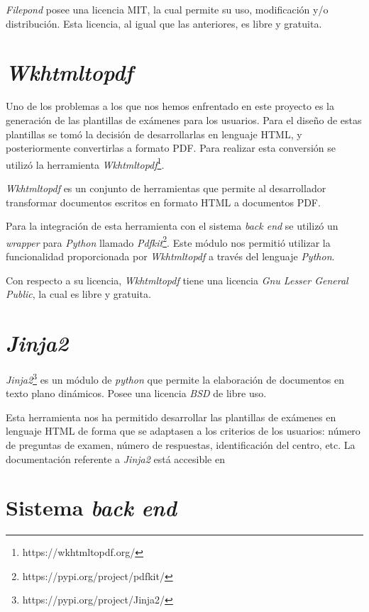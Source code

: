 \documentclass[a4paper, 12pt]{book}
\begin{document}
\textit{Filepond} posee una licencia MIT, la cual permite su uso, modificación
y/o distribución. Esta licencia, al igual que las anteriores, es libre y gratuita.

\section{\textit{Wkhtmltopdf}}
\label{sec:wkhtmltopdf}

Uno de los problemas a los que nos hemos enfrentado en este proyecto es
la generación de las plantillas de exámenes para los usuarios. Para el diseño
de estas plantillas se tomó la decisión de desarrollarlas en lenguaje HTML,
y posteriormente convertirlas a formato PDF. Para realizar esta conversión
se utilizó la herramienta \textit{Wkhtmltopdf}\footnote{https://wkhtmltopdf.org/}.

\textit{Wkhtmltopdf} es un conjunto de herramientas que permite al desarrollador
transformar documentos escritos
en formato HTML a documentos PDF.

Para la integración de esta herramienta con el sistema \textit{back end}
se utilizó un \textit{wrapper} para \textit{Python} llamado
\textit{Pdfkit}\footnote{https://pypi.org/project/pdfkit/}. Este módulo nos
permitió utilizar la funcionalidad proporcionada por \textit{Wkhtmltopdf} a través
del lenguaje \textit{Python}.

Con respecto a su licencia, \textit{Wkhtmltopdf} tiene una licencia
\textit{Gnu Lesser General Public}, la cual es libre y gratuita.

\section{\textit{Jinja2}}
\label{sec:jinja2}

\textit{Jinja2}\footnote{https://pypi.org/project/Jinja2/} es un módulo
de \textit{python} que permite la elaboración de documentos en texto
plano dinámicos. Posee una licencia \textit{BSD} de libre uso.

Esta herramienta nos ha permitido desarrollar las plantillas
de exámenes en lenguaje HTML de forma que se adaptasen a los criterios de
los usuarios: número de preguntas de examen, número de respuestas,
identificación del centro, etc. La documentación referente a \textit{Jinja2} está
accesible en \cite{jinja2:documentation}

\section{Sistema \textit{back end}} 
\label{sec:omr}
\end{document}
